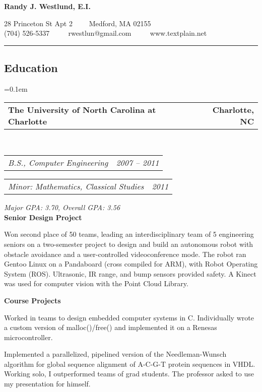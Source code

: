 \documentclass[10pt,letterpaper]{article}
\makeatletter
\newcommand{\headerrow}[2]
{\begin{tabular*}{\linewidth}{l@{\extracolsep{\fill}}r}
	#1 & #2 \\
\end{tabular*}}
\makeatother
\begin{document}
\begin{center}
{\LARGE \textbf{Randy J. Westlund, E.I.}}

28 Princeton St Apt 2 \ \ \textbullet \ \ Medford, MA 02155 \\
(704) 526-5337 \ \ \textbullet
\ \ rwestlun@gmail.com \ \ \textbullet
\ \ www.textplain.net
\end{center}

\hrule
\vspace{-0.4em}
\subsection*{Education}
\begin{itemize*}
	\parskip=0.1em
	\item 
	\headerrow
		{\textbf{The University of North Carolina at Charlotte}}
		{\textbf{Charlotte, NC}}
	\\
	\headerrow
		{\emph{B.S., Computer Engineering}}
		{\emph{2007 -- 2011}}
	\headerrow
		{\emph{Minor: Mathematics, Classical Studies}}
		{\emph{2011}}
        \emph{Major GPA: 3.70, Overall GPA: 3.56} \\
        \textbf{Senior Design Project}
        \begin{itemize*}
            \item Won second place of 50 teams, leading an interdisciplinary
                team of 5 engineering seniors on a two-semester project to
                design and build an autonomous robot with obstacle avoidance
                and a user-controlled videoconference mode. The robot ran
                Gentoo Linux on a Pandaboard (cross compiled for ARM), with
                Robot Operating System (ROS). Ultrasonic, IR range, and bump
                sensors provided safety. A Kinect was used for computer vision
                with the Point Cloud Library.
        \end{itemize*}
    \textbf{Course Projects}
    \begin{itemize*}
        \item Worked in teams to design embedded computer systems in C.
            Individually wrote a custom version of malloc()/free() and
            implemented it on a Renesas microcontroller.

        \item Implemented a parallelized, pipelined version of the
            Needleman-Wunsch algorithm for global sequence alignment of A-C-G-T
            protein sequences in VHDL\@.  Working solo, I outperformed teams of
            grad students.  The professor asked to use my presentation for
            himself.


\end{itemize*}
\end{itemize*}
\end{document}

